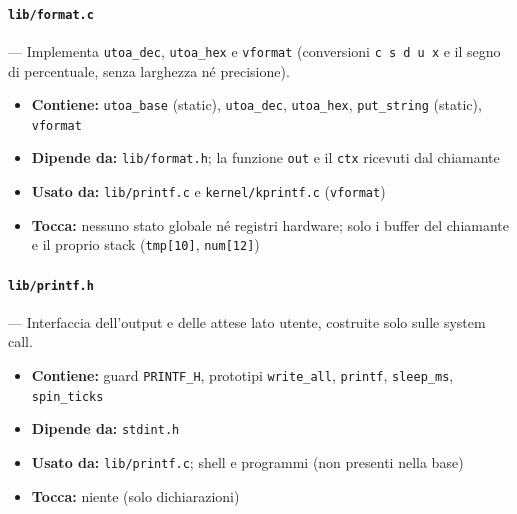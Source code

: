 \paragraph{\texttt{lib/format.c}} --- Implementa \texttt{utoa\_dec}, \texttt{utoa\_hex} e \texttt{vformat} (conversioni \texttt{c s d u x} e il segno di percentuale, senza larghezza né precisione).
\begin{itemize}
  \item \textbf{Contiene:} \texttt{utoa\_base} (static), \texttt{utoa\_dec}, \texttt{utoa\_hex}, \texttt{put\_string} (static), \texttt{vformat}
  \item \textbf{Dipende da:} \texttt{lib/format.h}; la funzione \texttt{out} e il \texttt{ctx} ricevuti dal chiamante
  \item \textbf{Usato da:} \texttt{lib/printf.c} e \texttt{kernel/kprintf.c} (\texttt{vformat})
  \item \textbf{Tocca:} nessuno stato globale né registri hardware; solo i buffer del chiamante e il proprio stack (\texttt{tmp[10]}, \texttt{num[12]})
\end{itemize}

\paragraph{\texttt{lib/printf.h}} --- Interfaccia dell'output e delle attese lato utente, costruite solo sulle system call.
\begin{itemize}
  \item \textbf{Contiene:} guard \texttt{PRINTF\_H}, prototipi \texttt{write\_all}, \texttt{printf}, \texttt{sleep\_ms}, \texttt{spin\_ticks}
  \item \textbf{Dipende da:} \texttt{stdint.h}
  \item \textbf{Usato da:} \texttt{lib/printf.c}; shell e programmi (non presenti nella base)
  \item \textbf{Tocca:} niente (solo dichiarazioni)
\end{itemize}

